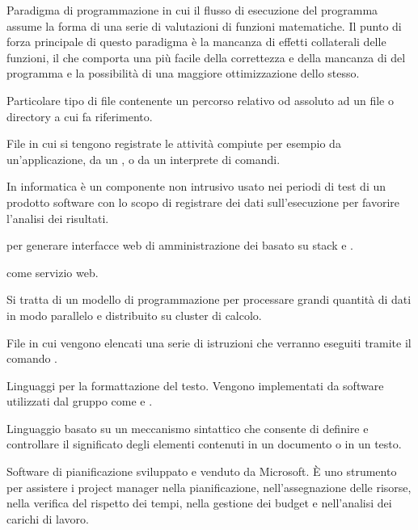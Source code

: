 Paradigma di programmazione in cui il flusso di esecuzione del programma assume la forma di una serie di valutazioni di funzioni matematiche. Il punto di forza principale di questo paradigma è la mancanza di effetti collaterali delle funzioni, il che comporta una più facile  della correttezza e della mancanza di  del programma e la possibilità di una maggiore ottimizzazione dello stesso.

Particolare tipo di file contenente un percorso relativo od assoluto ad un file o directory a cui fa riferimento.

File in cui si tengono registrate le attività compiute per esempio da un'applicazione, da un , o da un interprete di comandi.

In informatica è un componente non intrusivo usato nei periodi di test di un prodotto software con lo scopo di registrare dei dati sull'esecuzione per favorire l'analisi dei risultati.


 per generare interfacce web di amministrazione dei  basato su stack  e .

\ProjectName{} come servizio web.

Si tratta di un modello di programmazione per processare grandi quantità di dati in modo parallelo e distribuito su cluster di calcolo.

File in cui vengono elencati una serie di istruzioni che verranno eseguiti tramite il comando .

Linguaggi per la formattazione del testo. Vengono implementati da software utilizzati dal gruppo come  e .

Linguaggio basato su un meccanismo sintattico che consente di definire e controllare il significato degli elementi contenuti in un documento o in un testo.

Software di pianificazione sviluppato e venduto da Microsoft. È  uno strumento per assistere i project manager nella pianificazione, nell'assegnazione delle risorse, nella verifica del rispetto dei tempi, nella gestione dei budget e nell'analisi dei carichi di lavoro.

